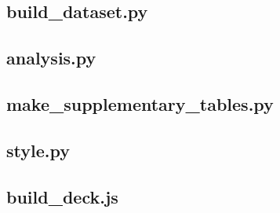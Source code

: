 \clearpage
\subsection{build\_dataset.py}
\label{sec:code-build}


\clearpage
\subsection{analysis.py}
\label{sec:code-analysis}


\clearpage
\subsection{make\_supplementary\_tables.py}
\label{sec:code-tables}


\clearpage
\subsection{style.py}
\label{sec:code-style}


\clearpage
\subsection{build\_deck.js}
\label{sec:code-deck}

